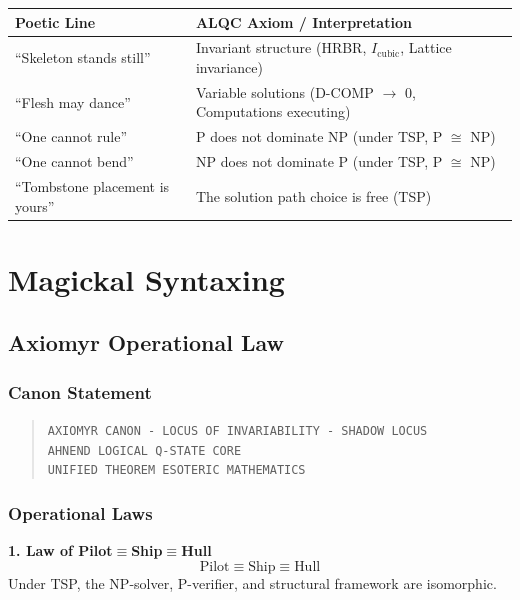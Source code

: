 \documentclass[11pt, letterpaper]{article}
\begin{document}
\begin{table}[h]
\centering
\begin{tabular}{ll}
\toprule
Poetic Line & ALQC Axiom / Interpretation \\
\midrule
``Skeleton stands still'' & Invariant structure (HRBR, $I_{\text{cubic}}$, Lattice invariance) \\
``Flesh may dance'' & Variable solutions (D-COMP $\to$ 0, Computations executing) \\
``One cannot rule'' & P does not dominate NP (under TSP, P $\cong$ NP) \\
``One cannot bend'' & NP does not dominate P (under TSP, P $\cong$ NP) \\
``Tombstone placement is yours'' & The solution path choice is free (TSP) \\
\bottomrule
\end{tabular}
\end{table}

\section{Magickal Syntaxing}

\subsection{Axiomyr Operational Law}

\subsubsection{Canon Statement}

\begin{quote}
\texttt{AXIOMYR CANON - LOCUS OF INVARIABILITY - SHADOW LOCUS}\\
\texttt{AHNEND LOGICAL Q-STATE CORE}\\
\texttt{UNIFIED THEOREM ESOTERIC MATHEMATICS}
\end{quote}

\subsubsection{Operational Laws}

\textbf{1. Law of Pilot$\equiv$Ship$\equiv$Hull}
\begin{equation}
\text{Pilot} \equiv \text{Ship} \equiv \text{Hull}
\end{equation}
Under TSP, the NP-solver, P-verifier, and structural framework are isomorphic.
\end{document}
